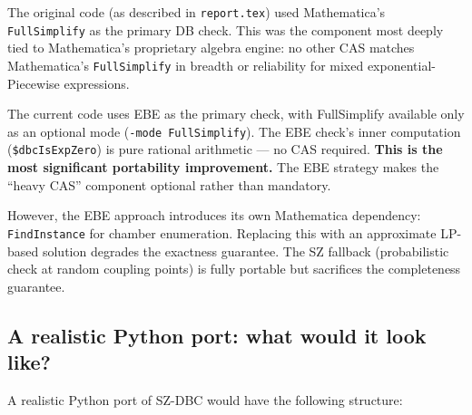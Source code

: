 \documentclass[12pt,a4paper]{article}
\theoremstyle{critical}
\theoremstyle{remark}
\theoremstyle{verified}
\begin{document}
The original code (as described in \texttt{report.tex}) used Mathematica's
\texttt{FullSimplify} as the primary DB check.  This was the component most
deeply tied to Mathematica's proprietary algebra engine: no other CAS matches
Mathematica's \texttt{FullSimplify} in breadth or reliability for mixed
exponential-Piecewise expressions.

The current code uses EBE as the primary check, with FullSimplify available only
as an optional mode (\texttt{-mode FullSimplify}).  The EBE check's inner
computation (\texttt{\$dbcIsExpZero}) is pure rational arithmetic --- no CAS
required.  \textbf{This is the most significant portability improvement.}  The
EBE strategy makes the ``heavy CAS'' component optional rather than mandatory.

However, the EBE approach introduces its own Mathematica dependency:
\texttt{FindInstance} for chamber enumeration.  Replacing this with an approximate
LP-based solution degrades the exactness guarantee.  The SZ fallback (probabilistic
check at random coupling points) is fully portable but sacrifices the completeness
guarantee.

\subsection{A realistic Python port: what would it look like?}

A realistic Python port of SZ-DBC would have the following structure:
\end{document}
